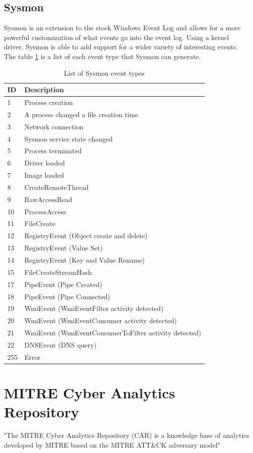 \subsection{Sysmon}
Sysmon is an extension to the stock Windows Event Log and allows for a more powerful customization of what events go into the event log. Using a kernel driver, Sysmon is able to add support for a wider variety of interesting events. The table \ref{tab:sysmoneventtypes} is a list of each event type that Sysmon can generate.

\begin{table}[ht]
\begin{tabular}{l|l}
ID & Description \\ \hline
1 & Process creation \\
2 & A process changed a file creation time \\
3 & Network connection \\
4 & Sysmon service state changed \\
5 & Process terminated \\
6 & Driver loaded \\
7 & Image loaded \\
8 & CreateRemoteThread \\
9 & RawAccessRead \\
10 & ProcessAccess \\
11 & FileCreate \\
12 & RegistryEvent (Object create and delete) \\
13 & RegistryEvent (Value Set) \\
14 & RegistryEvent (Key and Value Rename) \\
15 & FileCreateStreamHash \\
17 & PipeEvent (Pipe Created) \\
18 & PipeEvent (Pipe Connected) \\
19 & WmiEvent (WmiEventFilter activity detected) \\
20 & WmiEvent (WmiEventConsumer activity detected) \\
21 & WmiEvent (WmiEventConsumerToFilter activity detected) \\
22 & DNSEvent (DNS query) \\
255 & Error
\end{tabular}
\caption{List of Sysmon event types}
\label{tab:sysmoneventtypes}
\end{table}

\section{MITRE Cyber Analytics Repository}
"The MITRE Cyber Analytics Repository (CAR) is a knowledge base of analytics developed by MITRE based on the MITRE ATT\&CK adversary model"

